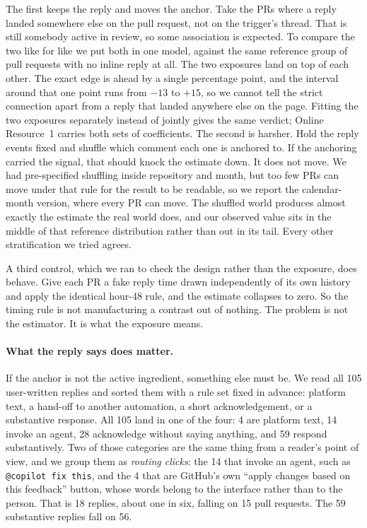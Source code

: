\documentclass[lineno,pdflatex,sn-basic]{sn-jnl}
\begin{document}
The first keeps the reply and moves the anchor. Take the PRs where a reply landed
somewhere else on the pull request, not on the trigger's thread. That is still somebody active in review, so some association is expected. To
compare the two like for like we put both in one model, against the same
reference group of pull requests with no inline reply at all. The two exposures land on
top of each other. The exact edge is ahead by a single percentage point, and the
interval around that one point runs from $-13$ to $+15$, so we cannot tell the
strict connection apart from a reply that landed anywhere else on the page.
Fitting the two exposures separately instead of jointly gives the same verdict;
Online Resource~1 carries both sets of coefficients. The second is harsher. Hold the reply events fixed and shuffle which comment each
one is anchored to. If the anchoring carried the signal, that should knock the
estimate down. It does not move. We had pre-specified shuffling inside repository
and month, but too few PRs can move under that rule for the result to be
readable, so we report the calendar-month version, where every PR can move. The
shuffled world produces almost exactly the estimate the real world does, and our
observed value sits in the middle of that reference distribution rather than out
in its tail. Every other stratification we tried agrees.

A third control, which we ran to check the design rather than the exposure, does
behave. Give each PR a fake reply time drawn independently of its own history and
apply the identical hour-48 rule, and the estimate collapses to zero. So the
timing rule is not manufacturing a contrast out of nothing. The problem is not the
estimator. It is what the exposure means.

\paragraph{What the reply says does matter.} If the anchor is not the active
ingredient, something else must be. We read all 105 user-written replies and
sorted them with a rule set fixed in advance: platform text, a hand-off to another
automation, a short acknowledgement, or a substantive response. All 105 land in
one of the four: 4 are platform text, 14 invoke an agent, 28 acknowledge without
saying anything, and 59 respond substantively. Two of those categories are the same thing from a reader's point of view, and we
group them as \emph{routing clicks}: the 14 that invoke an agent, such as
\texttt{@copilot fix this}, and the 4 that are GitHub's own ``apply changes based
on this feedback'' button, whose words belong to the interface rather than to the
person. That is 18 replies, about one in six, falling on 15 pull requests. The 59
substantive replies fall on 56.
\end{document}
